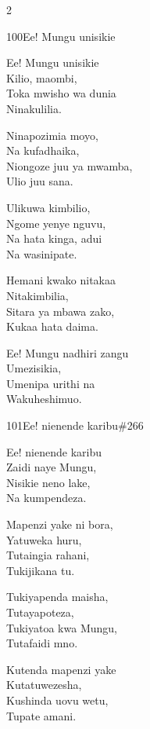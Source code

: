 \begin{multicols}{2}
\begin{hymn}{100}{Ee! Mungu unisikie}{}
\begin{stanza}
Ee! Mungu unisikie\\
Kilio, maombi,\\
Toka mwisho wa dunia\\
Ninakulilia.
\end{stanza}
\begin{stanza}
Ninapozimia moyo,\\
Na kufadhaika,\\
Niongoze juu ya mwamba,\\
Ulio juu sana.
\end{stanza}
\begin{stanza}
Ulikuwa kimbilio,\\
Ngome yenye nguvu,\\
Na hata kinga, adui\\
Na wasinipate.
\end{stanza}
\begin{stanza}
Hemani kwako nitakaa\\
Nitakimbilia,\\
Sitara ya mbawa zako,\\
Kukaa hata daima.
\end{stanza}
\begin{stanza}
Ee! Mungu nadhiri zangu\\
Umezisikia,\\
Umenipa urithi na\\
Wakuheshimuo.
\end{stanza}
\end{hymn}

\begin{hymn}{101}{Ee! nienende karibu}{\#266}
\begin{stanza}
Ee! nienende karibu\\
Zaidi naye Mungu,\\
Nisikie neno lake,\\
Na kumpendeza.
\end{stanza}
\begin{stanza}
Mapenzi yake ni bora,\\
Yatuweka huru,\\
Tutaingia rahani,\\
Tukijikana tu.
\end{stanza}
\begin{stanza}
Tukiyapenda maisha,\\
Tutayapoteza,\\
Tukiyatoa kwa Mungu,\\
Tutafaidi mno.
\end{stanza}
\begin{stanza}
Kutenda mapenzi yake\\
Kutatuwezesha,\\
Kushinda uovu wetu,\\
Tupate amani.
\end{stanza}
\end{hymn}


\end{multicols}
